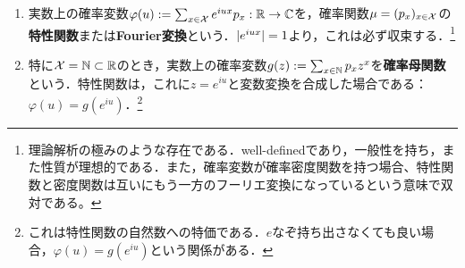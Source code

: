 \documentclass[uplatex,dvipdfmx]{jsreport}
\begin{document}
\begin{definition}\mbox{}
    \begin{enumerate}
        \item 実数上の確率変数$\varphi(u):=\sum_{x\in\mathcal{X}}e^{iux}p_x:\mathbb{R}\to\mathbb{C}$を，確率関数$\mu=(p_x)_{x\in\mathcal{X}}$の\textbf{特性関数}または\textbf{Fourier変換}という．$\lvert e^{iux}\rvert=1$より，これは必ず収束する．\footnote{理論解析の極みのような存在である．well-definedであり，一般性を持ち，また性質が理想的である．また，確率変数が確率密度関数を持つ場合、特性関数と密度関数は互いにもう一方のフーリエ変換になっているという意味で双対である。}
        \item 特に$\mathcal{X}=\mathbb{N}\subset\mathbb{R}$のとき，実数上の確率変数$g(z):=\sum_{x\in\mathbb{N}}p_xz^x$を\textbf{確率母関数}という．特性関数は，これに$z=e^{iu}$と変数変換を合成した場合である：$\varphi(u)=g(e^{iu})$．\footnote{これは特性関数の自然数への特価である．$e$なぞ持ち出さなくても良い場合，$\varphi(u)=g(e^{iu})$という関係がある．}
    \end{enumerate}
\end{definition}
\end{document}
